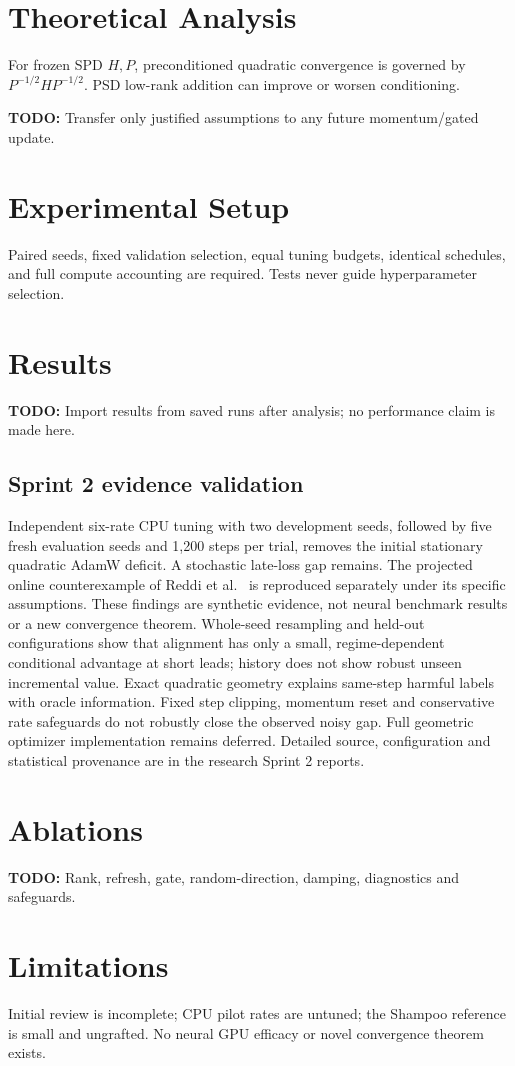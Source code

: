 \documentclass[11pt]{article}
\newcommand{\todo}[1]{\par\noindent\textbf{TODO:} #1\par}
\begin{document}
\section{Theoretical Analysis}
For frozen SPD $H,P$, preconditioned quadratic convergence is governed by
$P^{-1/2}HP^{-1/2}$. PSD low-rank addition can improve or worsen conditioning.
\todo{Transfer only justified assumptions to any future momentum/gated update.}
\section{Experimental Setup}
Paired seeds, fixed validation selection, equal tuning budgets, identical schedules,
and full compute accounting are required. Tests never guide hyperparameter selection.
\section{Results}
\todo{Import results from saved runs after analysis; no performance claim is made here.}
\subsection{Sprint 2 evidence validation}
Independent six-rate CPU tuning with two development seeds, followed by five
fresh evaluation seeds and 1,200 steps per trial, removes the initial stationary
quadratic AdamW deficit. A stochastic late-loss gap remains. The projected online
counterexample of Reddi et al.\ \cite{amsgrad2018} is reproduced separately under
its specific assumptions. These findings are synthetic evidence, not neural
benchmark results or a new convergence theorem.
Whole-seed resampling and held-out configurations show that alignment has only
a small, regime-dependent conditional advantage at short leads; history does
not show robust unseen incremental value. Exact quadratic geometry explains
same-step harmful labels with oracle information. Fixed step clipping, momentum
reset and conservative rate safeguards do not robustly close the observed noisy
gap. Full geometric optimizer implementation remains deferred. Detailed source,
configuration and statistical provenance are in the research Sprint 2 reports.
\section{Ablations}
\todo{Rank, refresh, gate, random-direction, damping, diagnostics and safeguards.}
\section{Limitations}
Initial review is incomplete; CPU pilot rates are untuned; the Shampoo reference
is small and ungrafted. No neural GPU efficacy or novel convergence theorem exists.
\end{document}
